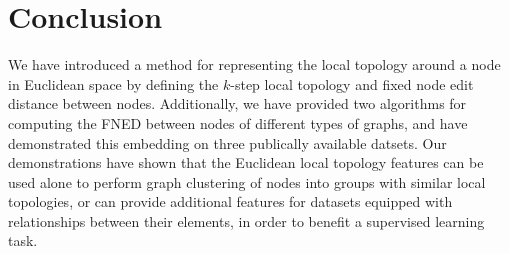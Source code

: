 \documentclass{article}
\begin{document}
\section{Conclusion}
\label{sec:conclusion}

We have introduced a method for representing the local topology around a node in Euclidean space by defining the $k$-step local topology and fixed node edit distance between nodes. Additionally, we have provided two algorithms for computing the FNED between nodes of different types of graphs, and have demonstrated this embedding on three publically available datsets. Our demonstrations have shown that the Euclidean local topology features can be used alone to perform graph clustering of nodes into groups with similar local topologies, or can provide additional features for datasets equipped with relationships between their elements, in order to benefit a supervised learning task. 


\begin{small}

 
\end{small}
\end{document}
